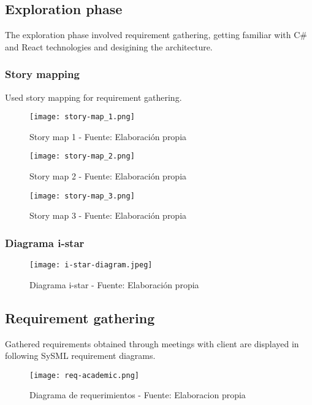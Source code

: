 \subsection{Exploration phase}
The exploration phase involved requirement gathering, getting familiar with C\# and React technologies and desigining the architecture.

\subsubsection{Story mapping}
Used story mapping for requirement gathering.
\begin{figure}[H]
    \centering
    \texttt{[image: story-map\_1.png]}
    \caption{Story map 1 - Fuente: Elaboración propia}
    \label{fig:story_map_1}
\end{figure}
\begin{figure}[H]
    \centering
    \texttt{[image: story-map\_2.png]}
    \caption{Story map 2 - Fuente: Elaboración propia}
    \label{fig:story_map_2}
\end{figure}
\begin{figure}[H]
    \centering
    \texttt{[image: story-map\_3.png]}
    \caption{Story map 3 - Fuente: Elaboración propia}
    \label{fig:story_map_3}
\end{figure}

\subsubsection{Diagrama i-star}
\begin{figure}[H]
    \centering
    \texttt{[image: i-star-diagram.jpeg]}
    \caption{Diagrama i-star - Fuente: Elaboración propia}
    \label{fig:i-star}
\end{figure}

\subsection{Requirement gathering}
Gathered requirements obtained through meetings with client are displayed in following SySML requirement diagrams.

\begin{figure}
    \texttt{[image: req-academic.png]}
    \caption{Diagrama de requerimientos - Fuente: Elaboracion propia}\label{fig:req-academic}
\end{figure}

